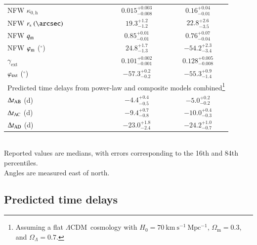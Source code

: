 \documentclass[longauth]{aa}
\newcommand{\lcdm}{$\Lambda$CDM}
\newcommand{\ajsiv}[1]{{{#1}}}
\begin{document}
\begin{table}
\begin{minipage}{\linewidth}
\begin{tabular}{l|c|c}
NFW $\kappa_{0,\mathrm{h}}$ &
$0.015_{-0.008}^{+0.003}$ &
$0.16_{-0.01}^{+0.04}$
\\
NFW $r_{\mathrm{s}}~(\arcsec)$ &
$19.3_{-1.2}^{+1.2}$ &
$22.8_{-3.5}^{+2.6}$
\\
NFW $q_{\rm m}$ &
$0.85_{-0.01}^{+0.01}$ &
$0.76_{-0.04}^{+0.07}$
\\
NFW $\varphi_{\rm m}$ ($^{\circ}$) &
$24.8_{-1.3}^{+1.7}$  & 
$-54.2^{+2.3}_{-3.4}$
\\
$\gamma_{\mathrm{ext}}$ &
$0.101_{-0.001}^{+0.002}$ &
$0.128_{-0.008}^{+0.005}$
\\
$\varphi_{\rm ext}$ ($^{\circ}$) &
$-57.3_{-0.2}^{+0.2}$ &
$-55.3^{+0.9}_{-1.4}$
\\
\hline
\multicolumn{3}{c}{\ajsiv{Predicted time delays from power-law and composite models combined}\footnote{\ajsiv{Assuming a flat \lcdm\ cosmology with $H_{0} = 70~\mathrm{km~s^{-1}~Mpc^{-1}}$, $\Omega_{\mathrm{m}} = 0.3$, and $\Omega_{\Lambda} = 0.7$.}}} \\
\hline
$\Delta t_{\rm AB}$ (d) & $-4.4_{-0.5}^{+0.4}$ & $-5.0_{-0.2}^{+0.2}$ \\
$\Delta t_{\rm AC}$ (d) & $-9.4_{-0.8}^{+0.7}$ & $-10.0^{+0.4}_{-0.3}$ \\
$\Delta t_{\rm AD}$ (d) & $-23.0_{-2.4}^{+1.8}$ & $-24.2_{-0.7}^{+1.0}$ \\
\hline
\end{tabular}
\\
{\footnotesize Reported values are medians, with errors corresponding to the 16th and 84th percentiles.}
\\
{\footnotesize Angles are measured east of north.}
\end{minipage}
\end{table}
\renewcommand*\arraystretch{1.0}


\subsection{Predicted time delays} \label{sec:time_delay_comapare}
\end{document}
